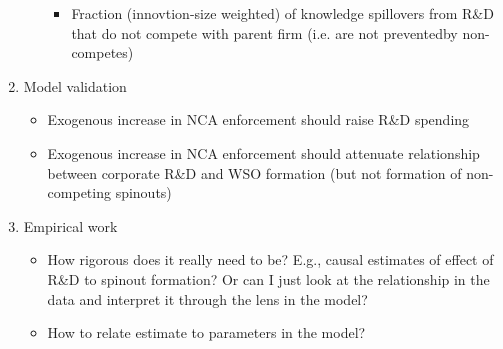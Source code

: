 \documentclass[12pt,english]{article}
\theoremstyle{remark}
\begin{document}
\begin{enumerate}
\begin{itemize}
\begin{itemize}
\begin{itemize}
			\end{itemize}
			\item Fraction (innovtion-size weighted) of knowledge spillovers from R\&D that do not compete with parent firm (i.e. are not preventedby non-competes)
		\end{itemize}
	\end{itemize}
	\item Model validation
	\begin{itemize}
		\item Exogenous increase in NCA enforcement should raise R\&D spending
		\item Exogenous increase in NCA enforcement should attenuate relationship between corporate R\&D and WSO formation (but not formation of non-competing spinouts)
	\end{itemize}
	\item Empirical work
	\begin{itemize}
		\item How rigorous does it really need to be? E.g., causal estimates of effect of R\&D to spinout formation? Or can I just look at the relationship in the data and interpret it through the lens in the model?
		\item How to relate estimate to parameters in the model? 
	\end{itemize}
\end{enumerate}
\end{document}
